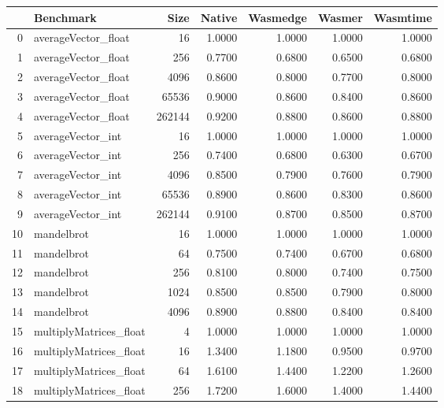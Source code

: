 \begin{tabular}{rlrrrrr}
\toprule
    & Benchmark              &   Size &   Native &   Wasmedge &   Wasmer &   Wasmtime \\
\midrule
  0 & averageVector\_float    &     16 &   1.0000 &     1.0000 &   1.0000 &     1.0000 \\
  1 & averageVector\_float    &    256 &   0.7700 &     0.6800 &   0.6500 &     0.6800 \\
  2 & averageVector\_float    &   4096 &   0.8600 &     0.8000 &   0.7700 &     0.8000 \\
  3 & averageVector\_float    &  65536 &   0.9000 &     0.8600 &   0.8400 &     0.8600 \\
  4 & averageVector\_float    & 262144 &   0.9200 &     0.8800 &   0.8600 &     0.8800 \\
  5 & averageVector\_int      &     16 &   1.0000 &     1.0000 &   1.0000 &     1.0000 \\
  6 & averageVector\_int      &    256 &   0.7400 &     0.6800 &   0.6300 &     0.6700 \\
  7 & averageVector\_int      &   4096 &   0.8500 &     0.7900 &   0.7600 &     0.7900 \\
  8 & averageVector\_int      &  65536 &   0.8900 &     0.8600 &   0.8300 &     0.8600 \\
  9 & averageVector\_int      & 262144 &   0.9100 &     0.8700 &   0.8500 &     0.8700 \\
 10 & mandelbrot             &     16 &   1.0000 &     1.0000 &   1.0000 &     1.0000 \\
 11 & mandelbrot             &     64 &   0.7500 &     0.7400 &   0.6700 &     0.6800 \\
 12 & mandelbrot             &    256 &   0.8100 &     0.8000 &   0.7400 &     0.7500 \\
 13 & mandelbrot             &   1024 &   0.8500 &     0.8500 &   0.7900 &     0.8000 \\
 14 & mandelbrot             &   4096 &   0.8900 &     0.8800 &   0.8400 &     0.8400 \\
 15 & multiplyMatrices\_float &      4 &   1.0000 &     1.0000 &   1.0000 &     1.0000 \\
 16 & multiplyMatrices\_float &     16 &   1.3400 &     1.1800 &   0.9500 &     0.9700 \\
 17 & multiplyMatrices\_float &     64 &   1.6100 &     1.4400 &   1.2200 &     1.2600 \\
 18 & multiplyMatrices\_float &    256 &   1.7200 &     1.6000 &   1.4000 &     1.4400 \\

\end{tabular}
